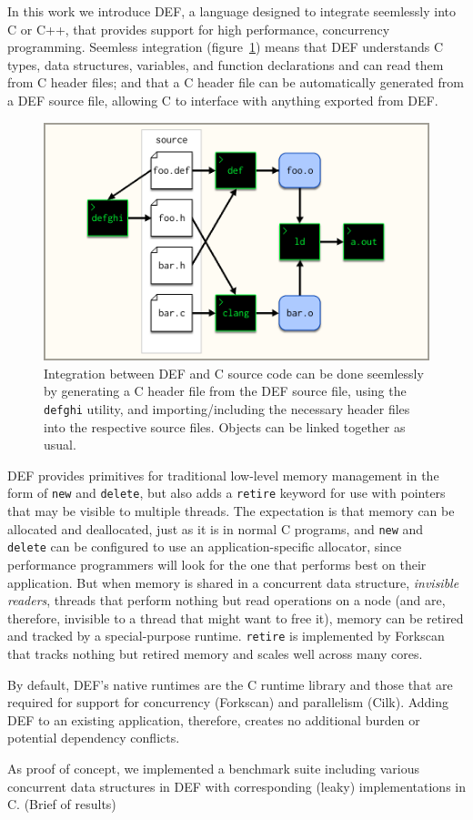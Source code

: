 In this work we introduce DEF, a language designed to integrate seemlessly into C or C++, that provides support for high performance, concurrency programming.  Seemless integration (figure~\ref{fig:seemless-integration}) means that DEF understands C types, data structures, variables, and function declarations and can read them from C header files; and that a C header file can be automatically generated from a DEF source file, allowing C to interface with anything exported from DEF.

\begin{figure}[htbp!]
        \centering
        \includegraphics[scale=0.25]{gfx/seemless-integration}
        \caption{Integration between DEF and C source code can be done seemlessly by generating a C header file from the DEF source file, using the \texttt{defghi} utility, and importing/including the necessary header files into the respective source files.  Objects can be linked together as usual.}
        \label{fig:seemless-integration}
\end{figure}

DEF provides primitives for traditional low-level memory management in the form of \texttt{new} and \texttt{delete}, but also adds a \texttt{retire} keyword for use with pointers that may be visible to multiple threads.  The expectation is that memory can be allocated and deallocated, just as it is in normal C programs, and \texttt{new} and \texttt{delete} can be configured to use an application-specific allocator, since performance programmers will look for the one that performs best on their application.  But when memory is shared in a concurrent data structure, \textit{invisible readers}, threads that perform nothing but read operations on a node (and are, therefore, invisible to a thread that might want to free it), memory can be retired and tracked by a special-purpose runtime.  \texttt{retire} is implemented by Forkscan that tracks nothing but retired memory and scales well across many cores.\cite{Forkscan}

By default, DEF's native runtimes are the C runtime library and those that are required for support for concurrency (Forkscan) and parallelism (Cilk\cite{BlumofeCilk}).  Adding DEF to an existing application, therefore, creates no additional burden or potential dependency conflicts.

As proof of concept, we implemented a benchmark suite including various concurrent data structures in DEF with corresponding (leaky) implementations in C. (Brief of results)

